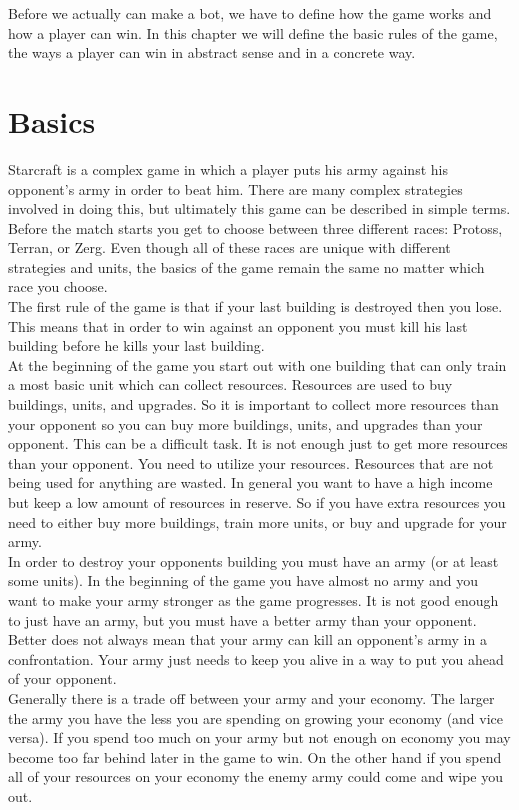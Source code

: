 Before we actually can make a bot, we have to define how the game works and how a player can win.
In this chapter we will define the basic rules of the game, the ways a player can win in abstract sense and in a concrete way.

\section{Basics}
	Starcraft is a complex game in which a player puts his army against his opponent's army in order to beat him. 
	There are many complex strategies involved in doing this, but ultimately this game can be described in simple terms.\\
	
	Before the match starts you get to choose between three different races: Protoss, Terran, or Zerg. 
	Even though all of these races are unique with different strategies and units, 
	the basics of the game remain the same no matter which race you choose.\\
	
	The first rule of the game is that if your last building is destroyed then you lose. 
	This means that in order to win against an opponent you must kill his last building before he kills your last building. \\
	
	At the beginning of the game you start out with one building that can only train a most basic unit which can collect resources. 
	Resources are used to buy buildings, units, and upgrades. 
	So it is important to collect more resources than your opponent so you can buy more buildings, units, and upgrades than your opponent.
	This can be a difficult task. It is not enough just to get more resources than your opponent. 
	You need to utilize your resources. Resources that are not being used for anything are wasted. 
	In general you want to have a high income but keep a low amount of resources in reserve. 
	So if you have extra resources you need to either buy more buildings, train more units, or buy and upgrade for your army.\\
	
	In order to destroy your opponents building you must have an army (or at least some units). 
	In the beginning of the game you have almost no army and you want to make your army stronger as the game progresses. 
	It is not good enough to just have an army, but you must have a better army than your opponent. 
	Better does not always mean that your army can kill an opponent's army in a confrontation. 
	Your army just needs to keep you alive in a way to put you ahead of your opponent.\\
	
	Generally there is a trade off between your army and your economy. 
	The larger the army you have the less you are spending on growing your economy (and vice versa). 
	If you spend too much on your army but not enough on economy you may become too far behind later in the game to win. 
	On the other hand if you spend all of your resources on your economy the enemy army could come and wipe you out.\\

 